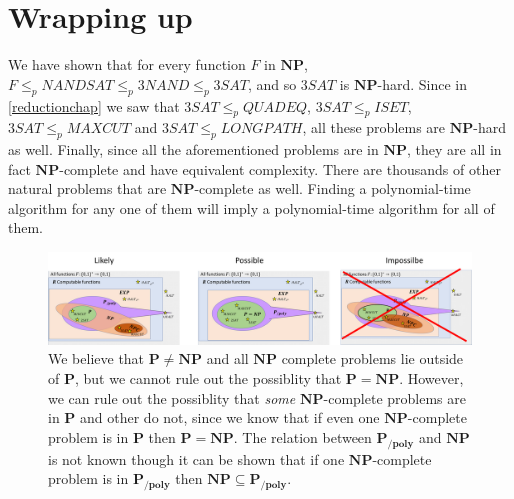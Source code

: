 \section{Wrapping up}\label{Wrapping-up}

We have shown that for every function \(F\) in \(\mathbf{NP}\),
\(F \leq_p \ensuremath{\mathit{NANDSAT}} \leq_p 3\ensuremath{\mathit{NAND}} \leq_p 3\ensuremath{\mathit{SAT}}\),
and so \(3\ensuremath{\mathit{SAT}}\) is \(\mathbf{NP}\)-hard. Since in
\cref{reductionchap} we saw that
\(3\ensuremath{\mathit{SAT}} \leq_p \ensuremath{\mathit{QUADEQ}}\),
\(3\ensuremath{\mathit{SAT}} \leq_p \ensuremath{\mathit{ISET}}\),
\(3\ensuremath{\mathit{SAT}} \leq_p \ensuremath{\mathit{MAXCUT}}\) and
\(3\ensuremath{\mathit{SAT}} \leq_p \ensuremath{\mathit{LONGPATH}}\),
all these problems are \(\mathbf{NP}\)-hard as well. Finally, since all
the aforementioned problems are in \(\mathbf{NP}\), they are all in fact
\(\mathbf{NP}\)-complete and have equivalent complexity. There are
thousands of other natural problems that are \(\mathbf{NP}\)-complete as
well. Finding a polynomial-time algorithm for any one of them will imply
a polynomial-time algorithm for all of them.


\begin{figure}
\centering
\includegraphics[width=\textwidth, height=0.25\paperheight, keepaspectratio]{../figure/inclusion_npc.png}
\caption{We believe that \(\mathbf{P} \neq \mathbf{NP}\) and all
\(\mathbf{NP}\) complete problems lie outside of \(\mathbf{P}\), but we
cannot rule out the possiblity that \(\mathbf{P}=\mathbf{NP}\). However,
we can rule out the possiblity that \emph{some} \(\mathbf{NP}\)-complete
problems are in \(\mathbf{P}\) and other do not, since we know that if
even one \(\mathbf{NP}\)-complete problem is in \(\mathbf{P}\) then
\(\mathbf{P}=\mathbf{NP}\). The relation between \(\mathbf{P_{/poly}}\)
and \(\mathbf{NP}\) is not known though it can be shown that if one
\(\mathbf{NP}\)-complete problem is in \(\mathbf{P_{/poly}}\) then
\(\mathbf{NP} \subseteq \mathbf{P_{/poly}}\).}
\label{npcinclusionfig}
\end{figure}

